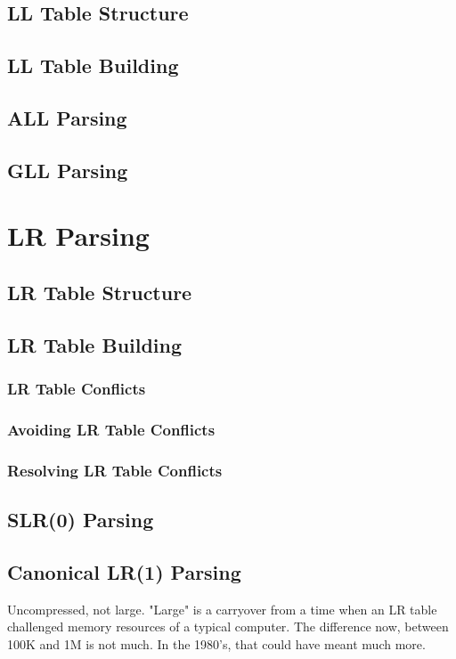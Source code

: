 \documentclass{book}
\begin{document}
\section{LL Table Structure}
\section{LL Table Building}
\section{ALL Parsing}
\section{GLL Parsing}


%
%
\chapter{LR Parsing}


\section{LR Table Structure}
\section{LR Table Building}

\subsection{LR Table Conflicts}
\subsection{Avoiding LR Table Conflicts}
\subsection{Resolving LR Table Conflicts}

\section{SLR(0) Parsing}

\section{Canonical LR(1) Parsing}
Uncompressed, not large. "Large" is a carryover from a time
when an LR table challenged memory resources of a 
typical computer. The difference now, between 100K and 1M
is not much. In the 1980's, that could have meant much more.
\end{document}
